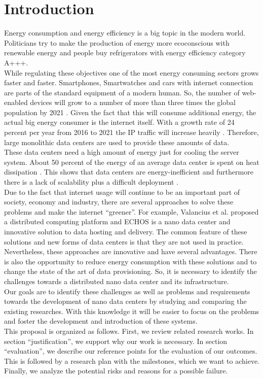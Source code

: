 \documentclass[sigchi-a, authorversion]{acmart}
\begin{document}
\section{Introduction} %
Energy consumption and energy efficiency is a big topic in the modern world. Politicians try to make the production of energy more ecoconscious with renewable energy and people buy refrigerators with energy efficiency category A+++. \\
While regulating these objectives one of the most energy consuming sectors grows faster and faster. Smartphones, Smartwatches and cars with internet connection are parts of the standard equipment of a modern human. So, the number of web-enabled devices will grow to a number of more than three times the global population by 2021 \cite{TheZetta68:online}. Given the fact that this will consume additional energy, the actual big energy consumer is the internet itself. With a growth rate of 24 percent per year from 2016 to 2021 the IP traffic will increase heavily \cite{TheZetta68:online}. Therefore, large monolithic data centers are used to provide these amounts of data. \\
These data centers need a high amount of energy just for cooling the server system. About 50 percent of the energy of an average data center is spent on heat dissipation \cite{DBLP:conf/conext/ValanciusLMDR09}. This shows that data centers are energy-inefficient and furthermore there is a lack of scalability plus a difficult deployment \cite{DBLP:conf/conext/ValanciusLMDR09}. \\
Due to the fact that internet usage will continue to be an important part of society, economy and industry, there are several approaches to solve these problems and make the internet ``greener''. For example, Valancius et al. \cite{DBLP:conf/conext/ValanciusLMDR09} proposed a distributed computing platform and ECHOS \cite{Laoutaris:2008:EEC:1341431.1341442} is a nano data center and innovative solution to data hosting and delivery. The common feature of these solutions and new forms of data centers is that they are not used in practice. \\
Nevertheless, these approaches are innovative and have several advantages. There is also the opportunity to reduce energy consumption with these solutions and to change the state of the art of data provisioning. So, it is necessary to identify the challenges towards a distributed nano data center and its infrastructure. \\
Our goals are to identify these challenges as well as problems and requirements towards the development of nano data centers by studying and comparing the existing researches. With this knowledge it will be easier to focus on the problems and foster the development and introduction of these systems. \\
This proposal is organized as follows. First, we review related research works. In section ``justification'', we support why our work is necessary. In section ``evaluation'', we describe our reference points for the evaluation of our outcomes. This is followed by a research plan with the milestones, which we want to achieve. Finally, we analyze the potential risks and reasons for a possible failure.
 \\
\end{document}
